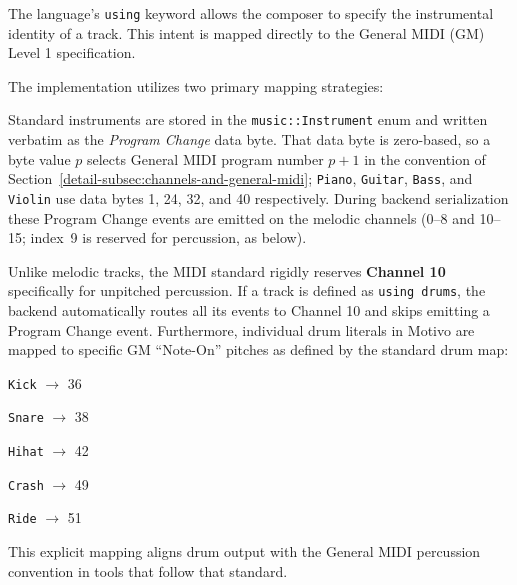 The language's \texttt{using} keyword allows the composer to specify the instrumental identity of a track.
This intent is mapped directly to the General MIDI (GM) Level 1 specification.

The implementation utilizes two primary mapping strategies:

 Standard instruments are stored in the \texttt{music::Instrument} enum and written
verbatim as the \textit{Program Change} data byte.
That data byte is zero-based, so a byte value $p$ selects General MIDI program number $p{+}1$ in the convention of
Section~\ref{detail-subsec:channels-and-general-midi}; \texttt{Piano}, \texttt{Guitar}, \texttt{Bass}, and
\texttt{Violin} use data bytes 1, 24, 32, and 40 respectively.
During backend serialization these Program Change events are emitted on the melodic channels (0--8 and 10--15; index~9
is reserved for percussion, as below).

 Unlike melodic tracks, the MIDI standard rigidly reserves \textbf{Channel 10}
specifically for unpitched percussion.
If a track is defined as \texttt{using drums}, the backend automatically routes all its events to Channel 10 and
skips emitting a Program Change event.
Furthermore, individual drum literals in Motivo are mapped to specific GM ``Note-On'' pitches as defined by the
standard drum map:

\texttt{Kick} $\rightarrow$ 36

\texttt{Snare} $\rightarrow$ 38

\texttt{Hihat} $\rightarrow$ 42

\texttt{Crash} $\rightarrow$ 49

\texttt{Ride} $\rightarrow$ 51

This explicit mapping aligns drum output with the General MIDI percussion convention in tools that follow that standard.

